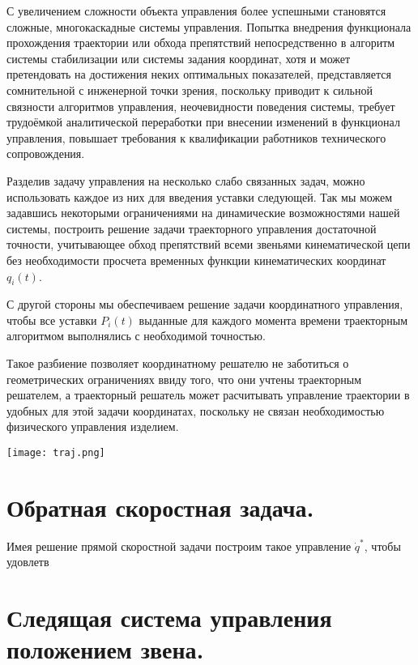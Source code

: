 \documentclass[12pt,a4paper,titlepage]{article}
\begin{document}
С увеличением сложности объекта управления более успешными становятся сложные, многокаскадные системы управления. Попытка внедрения функционала прохождения траектории или обхода препятствий непосредственно в алгоритм системы стабилизации или системы задания координат, хотя и может претендовать на достижения неких оптимальных показателей, представляется сомнительной с инженерной точки зрения, поскольку приводит к сильной связности алгоритмов управления, неочевидности поведения системы, требует трудоёмкой аналитической переработки при внесении изменений в функционал управления, повышает требования к квалификации работников технического сопровождения.

Разделив задачу управления на несколько слабо связанных задач, можно использовать каждое из них для введения уставки следующей. Так мы можем задавшись некоторыми ограничениями на динамические возможностями нашей системы, построить решение задачи траекторного управления достаточной точности, учитывающее обход препятствий всеми звеньями кинематической цепи без необходимости просчета временных функции кинематических координат $q_i(t)$. 

С другой стороны мы обеспечиваем решение задачи координатного управления, чтобы все уставки $P_i(t)$ выданные для каждого момента времени траекторным алгоритмом выполнялись с необходимой точностью.

Такое разбиение позволяет координатному решателю не заботиться о геометрических ограничениях ввиду того, что они учтены траекторным решателем, а траекторный решатель может расчитывать управление траектории в удобных для этой задачи координатах, поскольку не связан необходимостью физического управления изделием.   

\begin{center}
  \texttt{[image: traj.png]}
  \label{}
\end{center}

\newpage
\section{Обратная скоростная задача.}\label{invspd_sect}

Имея решение прямой скоростной задачи построим такое управление $\dot{q}^{*}$, чтобы удовлетв 

\newpage
\section{Следящая система управления положением звена.}
\end{document}
